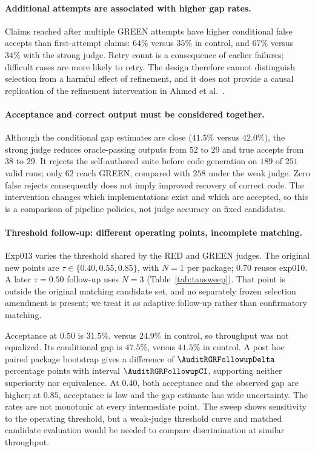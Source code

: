 \paragraph{Additional attempts are associated with higher gap rates.} Claims reached after
multiple GREEN attempts have higher conditional false accepts than first-attempt claims:
$64\%$ versus $35\%$ in control, and $67\%$ versus $34\%$ with the strong judge. Retry count
is a consequence of earlier failures; difficult cases are more likely to retry. The design
therefore cannot distinguish selection from a harmful effect of refinement, and it does not
provide a causal replication of the refinement intervention in Ahmed et al.~\cite{ahmed2025overfitting}.

\paragraph{Acceptance and correct output must be considered together.} Although the
conditional gap estimates are close ($41.5\%$ versus $42.0\%$), the strong judge reduces
oracle-passing outputs from $52$ to $29$ and true accepts from $38$ to $29$. It rejects the
self-authored suite before code generation on $189$ of $251$ valid runs; only $62$ reach
GREEN, compared with $258$ under the weak judge. Zero false rejects consequently does not
imply improved recovery of correct code. The intervention changes which implementations
exist and which are accepted, so this is a comparison of pipeline policies, not judge
accuracy on fixed candidates.

\paragraph{Threshold follow-up: different operating points, incomplete matching.} Exp013
varies the threshold shared by the RED and GREEN judges. The original new points are
$\tau\in\{0.40,0.55,0.85\}$, with $N{=}1$ per package; $0.70$ reuses exp010. A later
$\tau{=}0.50$ follow-up uses $N{=}3$ (Table~\ref{tab:tausweep}). That point is outside the
original matching candidate set, and no separately frozen selection amendment is present;
we treat it as adaptive follow-up rather than confirmatory matching.

Acceptance at $0.50$ is $31.5\%$, versus $24.9\%$ in control, so throughput was not equalized.
Its conditional gap is $47.5\%$, versus $41.5\%$ in control. A post hoc paired package
bootstrap gives a difference of $\AuditRGRFollowupDelta$ percentage points with interval
$\AuditRGRFollowupCI$, supporting neither superiority nor equivalence. At $0.40$, both
acceptance and the observed gap are higher; at $0.85$, acceptance is low and the gap estimate
has wide uncertainty. The rates are not monotonic at every intermediate point. The sweep
shows sensitivity to the operating threshold, but a weak-judge threshold curve and matched
candidate evaluation would be needed to compare discrimination at similar throughput.

